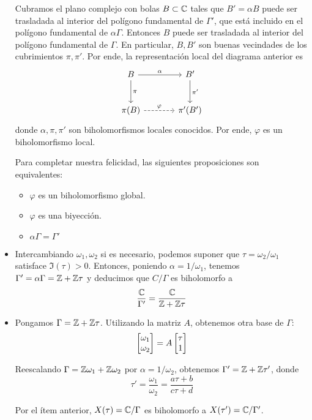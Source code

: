 \begin{solution}
\begin{itemize}
    Cubramos el plano complejo con bolas $B \subset \mathbb C$ tales que $B' = \alpha B$ puede ser trasladada al interior del polígono fundamental de $\Gamma'$, que está incluido en el polígono fundamental de $\alpha \Gamma$. Entonces $B$ puede ser trasladada al interior del polígono fundamental de $\Gamma$. En particular, $B, B'$ son buenas vecindades de los cubrimientos $\pi, \pi'$. Por ende, la representación local del diagrama anterior es
    $$
    \begin{tikzcd}[row sep=large, column sep=large]
        B \arrow[r, "\alpha"] \arrow[d, "\pi"] & B' \arrow[d, "\pi'"] \\
        \pi(B) \arrow[r, dashed, "\varphi"] & \pi'(B')
    \end{tikzcd}
    $$
    donde $\alpha, \pi, \pi'$ son biholomorfismos locales conocidos. Por ende, $\varphi$ es un biholomorfismo local.
    
    Para completar nuestra felicidad, las siguientes proposiciones son equivalentes:
    \begin{itemize}
        \item $\varphi$ es un biholomorfismo global.
        \item $\varphi$ es una biyección.
        \item $\alpha \Gamma = \Gamma'$
    \end{itemize}
    
    \item Intercambiando $\omega_1, \omega_2$ si es necesario, podemos suponer que $\tau = \omega_2 / \omega_1$ satisface $\Im(\tau) > 0$. Entonces, poniendo $\alpha = 1/\omega_1$, tenemos $\Gamma' = \alpha \Gamma = \mathbb Z + \mathbb Z \tau$ y deducimos que $C / \Gamma$ es biholomorfo a
    $$\frac {\mathbb C} {\Gamma'} = \frac {\mathbb C} {\mathbb Z + \mathbb Z \tau}$$
    
    \item Pongamos $\Gamma = \mathbb Z + \mathbb Z \tau$. Utilizando la matriz $A$, obtenemos otra base de $\Gamma$:
    $$\begin{bmatrix} \omega_1 \\ \omega_2 \end{bmatrix} = A \begin{bmatrix} \tau \\ 1 \end{bmatrix}$$
    
    Reescalando $\Gamma = \mathbb Z \omega_1 + \mathbb Z \omega_2$ por $\alpha = 1/\omega_2$, obtenemos $\Gamma' = \mathbb Z + \mathbb Z \tau'$, donde
    $$\tau' = \frac {\omega_1} {\omega_2} = \frac {a\tau + b} {c\tau + d}$$
    
    Por el ítem anterior, $X(\tau) = \mathbb C / \Gamma$ es biholomorfo a $X(\tau') = \mathbb C / \Gamma'$.
\end{itemize}
\end{solution}
